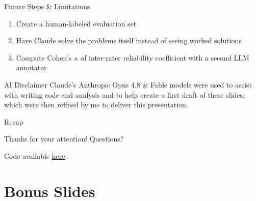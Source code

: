 \documentclass[10pt,aspectratio=169]{beamer}
\begin{document}
\begin{frame}{Future Steps \& Limitations}
\begin{enumerate} 
\item Create a human-labeled evaluation set \bigskip 
\item Have Claude solve the problems itself instead of seeing worked solutions \bigskip 
\item Compute Cohen's $\kappa$ of inter-rater reliability coefficient with a second LLM  annotator
\end{enumerate}

\end{frame} 

\begin{frame}{AI Disclaimer}
Claude's Anthropic Opus 4.8 \& Fable models were used to assist with writing code and analysis and to help create a first draft of these slides, which were then refined by me to deliver this presentation. 

\end{frame}


\begin{frame}{Recap}

\tableofcontents 
\end{frame}

\begin{frame}
  \centering
  {\Large Thanks for your attention! Questions?}

  \bigskip
  \small
  Code available \href{https://github.com/justinstevens42/SocraticMath}{here}.
\end{frame}


\section{Bonus Slides}
\end{document}
